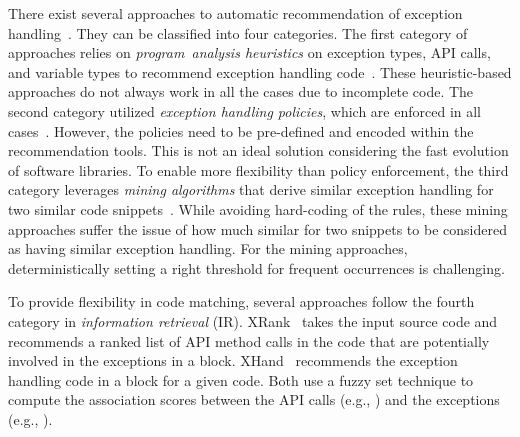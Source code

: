 There exist several approaches to automatic recommendation of
exception
handling~\cite{barbosa-bsse12,chanchal-scam14,barbosa-tse18,barbosa-tse16,xrank-fse20,throw-ase22}. They
can be classified into four categories. The first category of
approaches relies on {\em program~analysis heuristics} on
exception types, API calls, and variable types to recommend exception
handling code~\cite{barbosa-bsse12}. These heuristic-based approaches
do not always work in all the cases due to incomplete code. The second
category utilized {\em exception handling policies}, which are
enforced in all cases~\cite{barbosa-tse16,barbosa-saner18}. However,
the policies need to be pre-defined and encoded within the
recommendation tools.  This is not an ideal solution considering the
fast evolution of software libraries. To enable more flexibility than
policy enforcement, the third category leverages {\em mining
  algorithms} that derive similar exception handling for two similar
code snippets~\cite{chanchal-scam14}. While avoiding hard-coding of
the rules, these mining approaches suffer the issue of how much
similar for two snippets to be considered as having similar exception
handling. For the mining approaches, deterministically setting a right
threshold for frequent occurrences is challenging.


To provide flexibility in code matching, several approaches follow the fourth category in {\em information retrieval}
(IR). XRank~\cite{xrank-fse20} takes the input
source code and recommends a ranked list of API method calls in the
code that are potentially involved in the exceptions in a 
block. XHand~\cite{xrank-fse20} recommends the exception handling
code in a  block for a given code. Both use a fuzzy set
technique to compute the association scores between the API calls (e.g.,
) and the exceptions (e.g.,
).

